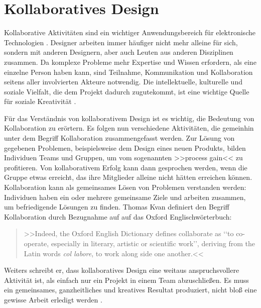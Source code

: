 \chapter{Kollaboratives Design}\label{ch:kollaborativesDesign} 

Kollaborative Aktivitäten sind ein wichtiger Anwendungsbereich für elektronische Technologien \citep{Kvan:2000}. Designer arbeiten immer häufiger nicht mehr alleine für sich, sondern mit anderen Designern, aber auch Leuten aus anderen Disziplinen zusammen. Da komplexe Probleme mehr Expertise und Wissen erfordern, als eine einzelne Person haben kann, sind Teilnahme, Kommunikation und Kollaboration seitens aller involvierten Akteure notwendig. Die intellektuelle, kulturelle und soziale Vielfalt, die dem Projekt dadurch zugutekommt, ist eine wichtige Quelle für soziale Kreativität \citep{Fischer:2005}. 

\medskip Für das Verständnis von kollaborativem Design ist es wichtig, die Bedeutung von Kollaboration zu erörtern. Es folgen nun verschiedene Aktivitäten, die gemeinhin unter dem Begriff Kollaboration zusammengefasst werden. Zur Lösung von gegebenen Problemen, beispielsweise dem Design eines neuen Produkts, bilden Individuen Teams und Gruppen, um vom sogenannten >>process gain<< \citep{steiner:1972} zu profitieren. Von kollaborativem Erfolg kann dann gesprochen werden, wenn die Gruppe etwas erreicht, das ihre  Mitglieder alleine nicht hätten erreichen können. Kollaboration kann als gemeinsames Lösen von Problemen verstanden werden: Individuen haben ein oder mehrere gemeinsame Ziele und arbeiten zusammen, um befriedigende Lösungen zu finden. Thomas Kvan definiert den Begriff Kollaboration durch Bezugnahme auf auf das Oxford Englischwörterbuch:

\begin{quote} 
	>>Indeed, the Oxford English Dictionary defines collaborate as ‘‘to co-operate, especially in literary, artistic or scientific work’’, deriving from the Latin words \emph{col labore}, to work along side one another.<< \citep{Kvan:2000} 
\end{quote} 

Weiters schreibt er, dass kollaboratives Design eine weitaus anspruchsvollere Aktivität ist, als einfach nur ein Projekt in einem Team abzuschließen. Es muss ein gemeinsames, ganzheitliches und kreatives Resultat produziert, nicht bloß eine gewisse Arbeit erledigt werden \citep{Kvan:2000}.

